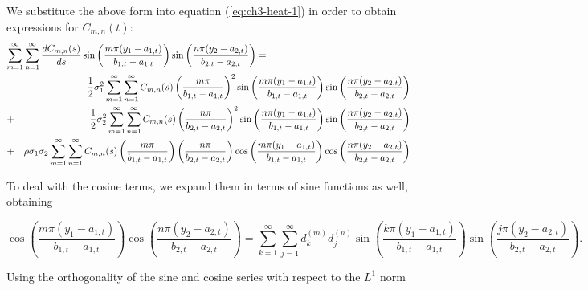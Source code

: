 We substitute the above form into equation (\ref{eq:ch3-heat-1}) in order to obtain expressions for $C_{m,n}(t)$:
\begin{eqnarray}
	\lefteqn{ \sum_{m=1}^\infty \sum_{n=1}^\infty \frac{dC_{m,n}(s)}{ds} \sin\left( \frac{m \pi (y_1 - a_{1,t})}{b_{1,t} - a_{1,t}} \right) \sin\left( \frac{n \pi (y_2 - a_{2,t})}{b_{2,t} - a_{2,t}} \right) =   } \nonumber \\
	&& \frac{1}{2}\sigma^2_1 \sum_{m=1}^\infty \sum_{n=1}^\infty C_{m,n}(s) \left( \frac{m\pi}{b_{1,t}-a_{1,t}} \right)^2 \sin\left( \frac{m \pi (y_1 - a_{1,t})}{b_{1,t} - a_{1,t}} \right) \sin\left( \frac{n \pi (y_2 - a_{2,t})}{b_{2,t} - a_{2,t}} \right) \nonumber \\
	&+&  \frac{1}{2}\sigma^2_2 \sum_{m=1}^\infty \sum_{n=1}^\infty C_{m,n}(s) \left( \frac{n\pi}{b_{2,t}-a_{2,t}} \right)^2 \sin\left( \frac{n \pi (y_1 - a_{1,t})}{b_{1,t} - a_{1,t}} \right) \sin\left( \frac{n \pi (y_2 - a_{2,t})}{b_{2,t} - a_{2,t}} \right) \nonumber \\
	&+& \rho \sigma_1 \sigma_2 \sum_{m=1}^\infty \sum_{n=1}^\infty C_{m,n}(s) \left( \frac{m\pi}{b_{1,t}-a_{1,t}} \right) \left( \frac{n\pi}{b_{2,t}-a_{2,t}} \right) \cos\left( \frac{m \pi (y_1 - a_{1,t})}{b_{1,t} - a_{1,t}} \right) \cos\left( \frac{n \pi (y_2 - a_{2,t})}{b_{2,t} - a_{2,t}} \right) \label{eq:expanded}
\end{eqnarray}

To deal with the cosine terms, we expand them in terms of sine functions as well, obtaining

\[
	\cos\left( \frac{m \pi (y_1 - a_{1,t})}{b_{1,t} - a_{1,t}} \right) \cos\left( \frac{n \pi (y_2 - a_{2,t})}{b_{2,t} - a_{2,t}} \right) = \sum_{k = 1}^\infty \sum_{j=1}^\infty d_{k}^{(m)} d_{j}^{(n)} \sin\left( \frac{k \pi (y_1 - a_{1,t})}{b_{1,t} - a_{1,t}} \right)\sin\left( \frac{j \pi (y_2 - a_{2,t})}{b_{2,t} - a_{2,t}} \right).
\]

Using the orthogonality of the sine and cosine series with respect to the $L^1$ norm

